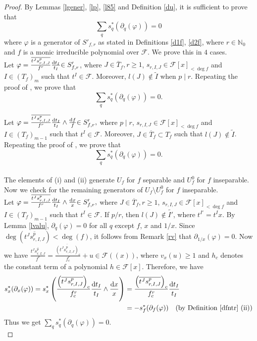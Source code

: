 \documentclass[times,10pt]{amsart}
\newcommand{\N}{\ensuremath{\mathbb{N}}}
\newcommand{\dd}{{\rm d}}
\newcommand{\F}{\ensuremath{\mathcal{F}}}
\renewcommand{\phi}{\varphi}
\begin{document}
     \begin{proof}
           By Lemmas \ref{lgener}, \ref{lp}, \ref{l85} and Definition \ref{du}, it is sufficient to prove that  \[ \sum_{q} s_q^*(\partial_q(\phi))=0\] where $\phi$ is a generator   of  $ S'_{f,r}$ as stated in Definitions \ref{d1f}, \ref{d2f}, where $r\in \N_0$ and $f$ is a monic irreducible polynomial over $\F$.   We prove this in $4 $ cases.\\

            Let ${\phi={\frac{\overline{t^J s^p_{r,I,J}}}{f^r}\frac{\dd t_I}{t_I}}}\textcolor{black}{\in S'_{f,r}}$, where  $ J\in \overline{T}_f,r\geq 1 $,  $s_{r,I,J}\in \F[x]_{< \deg f}$ and  $I\in ({T}_f)_{m}$ such that $t^I\in \F$.    Moreover,  $l(J)\notin \tilde{I}$ when $p\mid r$.     Repeating the proof of \cite[Theorem 5.1,  (i)]{Laghribi-Maiti}, we  prove that  \[ \sum_{q} s_q^*(\partial_q(\phi))=0.\]

            Let  ${\phi={\frac{\overline{t^J s^p_{r,I,J}}}{f^r}\frac{\dd t_I}{t_I}\wedge \frac{\dd f}{f}}}\textcolor{black}{\in S_{f,r}'} , $ where  $p\mid r$,  $ s_{r,I,J}\in \F[x]_{< \deg f}$ and $I\in ({T}_f)_{m-1}$ such that $t^I\in \F$. Moreover, $J\in \overline{T}_f\subset T_f$ such that $l(J)\notin \tilde{I}$.  Repeating the proof of  \cite[Theorem 5.1, (ii)]{Laghribi-Maiti}, we prove that  \[ \sum_{q} s_q^*(\partial_q(\phi))=0.\]  \\


The elements  of (i) and (ii)  generate $U_f$ for  $f$ separable  and $  U_f^0$ for $f$ inseparable.  Now we check for the remaining generators of $U_f\setminus U^0_f$ for $f$ inseparable.\\


             Let $ {\phi={\frac{\overline{t^J s^p_{r,I,J}}}{f^r}\frac{\dd t_I}{t_I}\wedge \frac{\dd x}{x}}}\textcolor{black}{\in S'_{f,r}},$ where $J\in \overline{T}_f, r\geq 1$, $s_{r,I,J}\in \F[x]_{< \deg f}$ and  $I\in ({T}_f)_{m-1}$ such that $t^I\in \F$.
      If  $p/r$, then  $l(J)\notin \tilde{I'}$, where $t^{I'}=t^I x$.  By Lemma \ref{lvalu},  $\partial_q(\phi)=0$ for all  $q$ except $f$, $x$ and $1/x$.  Since  $\deg (\overline{t^J s^p_{r,I,J}})< \deg (f)$, it follows from Remark \ref{rv} that $\partial_{1/x}(\phi)=0$. Now we have  $ \displaystyle{\frac{ \overline{t^Js^p_{r,I,J}}}{f^r}= \frac{ \overline{(t^Js^p_{r,I,J})}_c}{f^r_c}+u}\in \F((x))$, where $   v_x(u)\geq 1$ and $h_c$ denotes the constant term of a polynomial  $h\in \F[x]$.  Therefore, we have \begin{align*}
         s_x^*(\partial_x(\phi))= s_x^*\left( { \frac{\left(\overline{t^J s^p_{r,I,J}}\right)_c}{f_c^r}\frac{\dd t_I}{t_I}\wedge \frac{\dd x}{x}}\right)&= { \frac{\left(\overline{t^J s^p_{r,I,J}}\right)_c}{f_c^r}\frac{\dd t_I}{t_I}}\\&= - s_f^*(\partial_f(\phi))
\quad \text{(by Definition \ref{dfntr} (ii))}     \end{align*}   
            Thus we get $\sum_qs_q^*(\partial_q(\phi))=0$.\\



\end{proof}
\end{document}
